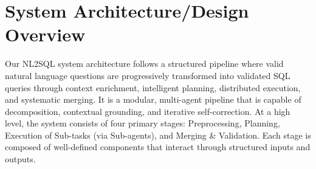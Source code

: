 \section{System Architecture/Design Overview}

Our NL2SQL system architecture follows a structured pipeline where valid natural language questions are progressively transformed into validated SQL queries through context enrichment, intelligent planning, distributed execution, and systematic merging. It is a modular, multi-agent pipeline that is capable of decomposition, contextual grounding, and iterative self-correction.
At a high level, the system consists of four primary stages: Preprocessing, Planning, Execution of Sub-tasks (via Sub-agents), and Merging \& Validation. Each stage is composed of well-defined components that interact through structured inputs and outputs.

